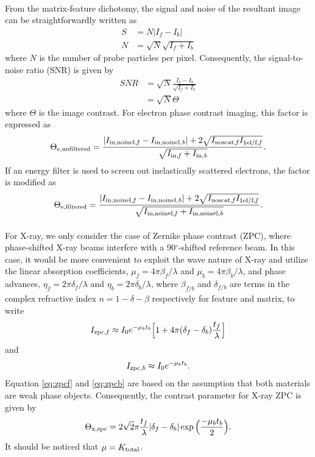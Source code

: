 \documentclass[review]{elsarticle}
\newcommand\nt{\textup{\scriptsize{0}}}
\newcommand\total{\textup{\scriptsize{total}}}
\newcommand\innoinelb{\textup{\scriptsize{in,noinel,\textit b}}}
\newcommand\inb{\textup{\scriptsize{in,\textit b}}}
\newcommand\noscatf{\textup{\scriptsize{noscat,\textit f}}}
\newcommand\selff{\textup{\scriptsize{1el/f,\textit f}}}
\newcommand\innoinelf{\textup{\scriptsize{in,noinel,\textit f}}}
\newcommand\inff{\textup{\scriptsize{in,\textit f}}}
\newcommand\zpcf{\textup{\scriptsize{zpc,\textit f}}}
\newcommand\zpcb{\textup{\scriptsize{zpc,\textit b}}}
\newcommand\xzpc{\textup{\scriptsize{x,zpc}}}
\begin{document}
\paragraph{} From the matrix-feature dichotomy, the signal and noise of the resultant image can be straightforwardly written as 
\begin{align}
S &= N|I_f-I_b| \\
N &= \sqrt{N}\sqrt{I_f+I_b}
\end{align}
where $N$ is the number of probe particles per pixel. Consequently, the signal-to-noise ratio (SNR) is given by \cite{Sun:2015fr}
\begin{equation}
\begin{aligned}
\textit{SNR} &= \sqrt{N}\frac{I_f-I_b}{\sqrt{I_f+I_b}} \\ &= \sqrt{N}\Theta
\end{aligned}
\end{equation}
where $\Theta$ is the image contrast. For electron phase contrast imaging, this factor is expressed as
\begin{equation}
\Theta_{\mathrm{e,unfiltered}} = \frac{|I_{\innoinelf}-I_{\innoinelb}|+2\sqrt{I_{\noscatf}I_{\selff}}}{\sqrt{I_{\inff}+I_{\inb}}}.
\end{equation}
If an energy filter is used to screen out inelastically scattered electrons, the factor is modified as
\begin{equation}
\Theta_{\mathrm{e,filtered}} = \frac{|I_{\innoinelf}-I_{\innoinelb}|+2\sqrt{I_{\noscatf}I_{\selff}}}{\sqrt{I_{\innoinelf}+I_{\innoinelb}}}.
\end{equation}

\paragraph{} For X-ray, we only consider the case of Zernike phase contrast (ZPC), where phase-shifted X-ray beams interfere with a 90$^\circ$-shifted reference beam. In this case, it would be more convenient to exploit the wave nature of X-ray and utilize the linear absorption coefficients, $\mu_f = 4\pi\beta_f/\lambda$ and $\mu_b = 4\pi\beta_b/\lambda$, and phase advances, $\eta_f = 2\pi\delta_f/\lambda$ and $\eta_b = 2\pi\delta_b/\lambda$, where $\beta_{f/b}$ and $\delta_{f/b}$ are terms in the complex refractive index $n = 1 - \delta - \beta$ respectively for feature and matrix, to write \cite{Jacobsen:ZMiInRZY}
\begin{equation}
I_{\zpcf} \approx I_{\nt} e^{-\mu_b t_b}\Big[ 1 + 4\pi(\delta_f - \delta_b)\frac{t_f}{\lambda}\Big]
\label{eq:zpcf}
\end{equation}
and
\begin{equation}
I_{\zpcb} \approx I_{\nt} e^{-\mu_b t_b}.
\label{eq:zpcb}
\end{equation}
Equation \ref{eq:zpcf} and \ref{eq:zpcb} are based on the assumption that both materials are weak phase objects. Consequently, the contrast parameter for X-ray ZPC is given by
\begin{equation}
\Theta_{\xzpc} = 2\sqrt{2}\pi\frac{t_f}{\lambda}|\delta_f - \delta_b|\exp\Big(\frac{-\mu_b t_b}{2}\Big).
\end{equation}
It should be noticed that $\mu = K_{\total}$.
\end{document}
